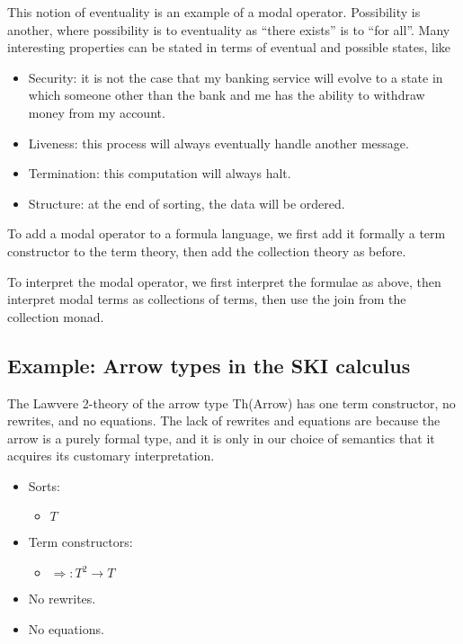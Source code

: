 \documentclass{article}
\newcommand{\maps}{\colon}
\newcommand{\lhom}{\Rightarrow}
\begin{document}
This notion of eventuality is an example of a modal operator.  Possibility is another, where possibility is to eventuality as ``there exists'' is to ``for all''.  Many interesting properties can be stated in terms of eventual and possible states, like
\begin{itemize}
  \item Security: it is not the case that my banking service will evolve to a state in which someone other than the bank and me has the ability to withdraw money from my account.
  \item Liveness: this process will always eventually handle another message.
  \item Termination: this computation will always halt.
  \item Structure: at the end of sorting, the data will be ordered.
\end{itemize}

To add a modal operator to a formula language, we first add it formally a term constructor to the term theory, then add the collection theory as before.  

To interpret the modal operator, we first interpret the formulae as above, then interpret modal terms as collections of terms, then use the join from the collection monad.

\subsection{Example: Arrow types in the SKI calculus}

The Lawvere 2-theory of the arrow type Th(Arrow) has one term constructor, no rewrites, and no equations.  The lack of rewrites and equations are because the arrow is a purely formal type, and it is only in our choice of semantics that it acquires its customary interpretation.
\begin{itemize}
  \item Sorts:
  \begin{itemize}
    \item $T$
  \end{itemize}
  \item Term constructors:
    \begin{itemize}
      \item $\lhom\maps T^2 \to T$
    \end{itemize}
  \item No rewrites.
  \item No equations.
\end{itemize}
\end{document}
